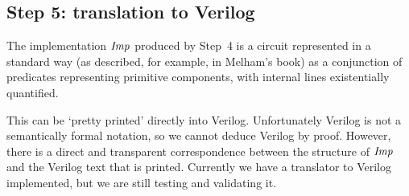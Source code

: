 \vspace*{-3mm}

\subsection*{Step 5: translation to Verilog}

The implementation ${\it{Imp}}$ produced by Step~4 is a circuit
represented in a standard way (as described, for example, in Melham's book)
as a conjunction of predicates representing primitive components,
with internal lines existentially quantified.

This can be `pretty printed' directly into Verilog. Unfortunately
Verilog is not a semantically formal notation, so we cannot deduce
Verilog by proof. However, there is a direct and transparent
correspondence between the structure of ${\it{Imp}}$ and the Verilog
text that is printed.  Currently we have a translator to Verilog
implemented, but we are still testing and validating it.



%
%
%
%
%
